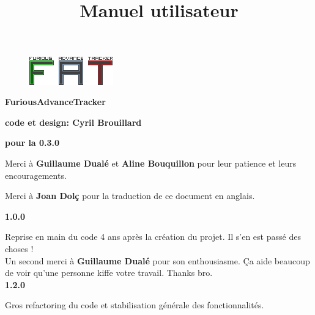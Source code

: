 \documentclass[12pt,a4paper]{article}
\title{\bf \SimpleImage{images/furicat_color}{0.3} \\ Manuel utilisateur}
\author{\fatversion}
\begin{document}
  \begin{figure}
    \begin{center}
    \includegraphics[scale=2]{images/logo}
    \end{center}
  \end{figure}
  \maketitle{}
  \thispagestyle{empty}
  \setcounter{page}{0}
  \ClearShipoutPicture

  \newpage

  \begin{center}
  
  {\bf \FAT FuriousAdvanceTracker} \medskip
  
  {\bf code et design: Cyril Brouillard} \medskip

  {\bf pour la 0.3.0} \medskip
  
  Merci à {\bf \textcolor{vert}{Guillaume Dualé}} et {\bf \textcolor{vert}{Aline Bouquillon}} pour leur patience et leurs encouragements.\medskip
  
  Merci à {\bf \textcolor{vert}{Joan Dolç}} pour la traduction de ce document en anglais. \medskip

  {\bf 1.0.0} \medskip

  Reprise en main du code 4 ans après la création du projet. Il s'en est passé des choses ! \\
  Un second merci à {\bf \textcolor{vert}{Guillaume Dualé}} pour son enthousiasme. Ça aide beaucoup de voir qu'une personne kiffe votre travail. Thanks bro. \\

  {\bf 1.2.0} \medskip

  Gros refactoring du code et stabilisation générale des fonctionnalités. 

  \end{center}
  
  \thispagestyle{empty}
  \setcounter{page}{0}
  \ClearShipoutPicture
  \newpage
  
  \tableofcontents{}
  \newpage
  
\end{document}
